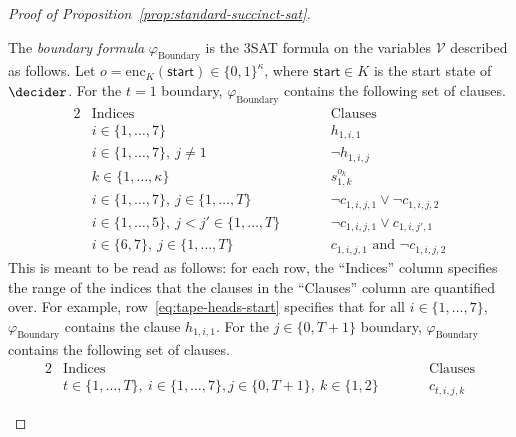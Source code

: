 \begin{proof}[Proof of Proposition~\ref{prop:standard-succinct-sat}]
  \begin{definition}
    The \emph{boundary formula} $\varphi_{\mathrm{Boundary}}$ is the 3SAT
    formula on the variables $\mathcal{V}$ described as follows.
    Let $o = \mathrm{enc}_K({\mathsf{start}}) \in \{0, 1\}^\kappa$, where
    ${\mathsf{start}} \in K$ is the start state of~$\decider$.
    For the $t= 1$ boundary, $\varphi_{\mathrm{Boundary}}$ contains the
    following set of clauses.
    \begin{alignat}{2}
      & \text{Indices} & \qquad & \text{Clauses}\nonumber\\
      & i \in \{1, \ldots, 7\} && h_{1, i, 1}
      \label{eq:tape-heads-start}\\
      & i \in \{1, \ldots, 7\},~ j \neq 1 && \neg h_{1, i, j}
      \label{eq:no-more-tape-heads}\\
      & k \in \{1, \ldots, \kappa\} && s_{1, k}^{o_k}
      \label{eq:start-state}\\
      & i \in \{1, \ldots, 7\},~ j \in \{1, \ldots, T\} &&
      \neg c_{1, i, j, 1} \lor \neg c_{1, i, j, 2}
      \label{eq:not-square}\\
      & i \in \{1, \ldots, 5\},~ j < j' \in \{1, \ldots, T\} &&
      \neg c_{1, i, j, 1} \lor c_{1, i, j', 1}
      \label{eq:trailing-empty}\\
      & i \in \{6, 7\},~ j \in \{1, \ldots, T\}
      && c_{1, i, j, 1} \text{ and } \neg c_{1, i, j, 2}
      \label{eq:all-empty}
    \end{alignat}
    This is meant to be read as follows: for each row, the ``Indices'' column
    specifies the range of the indices that the clauses in the ``Clauses'' column
    are quantified over.
    For example, row~\eqref{eq:tape-heads-start} specifies that for all $i \in
    \{1, \ldots, 7\}$, $\varphi_{\mathrm{Boundary}}$ contains the clause $h_{1,
      i, 1}$.
    For the $j \in \{0, T+1\}$ boundary, $\varphi_{\mathrm{Boundary}}$ contains
    the following set of clauses.
    \begin{alignat}{2}
      & \text{Indices} & \qquad & \text{Clauses}\nonumber\\
      & t \in \{1, \ldots, T\},~i \in \{1, \ldots, 7\},
      j \in \{0, T+1\},~k \in \{1, 2\}
      && c_{t, i, j, k} \label{eq:square}
    \end{alignat}
  \end{definition}


\end{proof}
